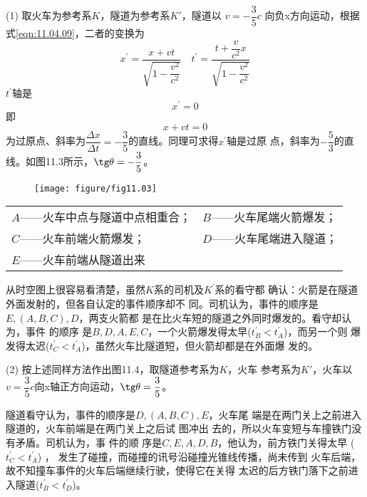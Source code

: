 \documentclass[../outline-of-mechanics.tex]{subfiles}
\begin{document}
(1) 取火车为参考系$ K $，隧道为参考系$ K' $，隧道以
$ v = - \dfrac { 3 } { 5 } c $
向负x方向运动，根据式\eqref{eqn:11.04.09}，二者的变换为
\begin{equation*}
  x^{\prime}=\frac{x+v t}{\sqrt{1-\dfrac{v^{2}}{c^{2}}}} \quad t^{\prime}=\frac{t+\dfrac{v}{c^{2}} x}{\sqrt{1-\dfrac{v^{2}}{c^{2}}}}
\end{equation*}
$ t ^ { \prime } $轴是
\begin{equation*}
  x ^ { \prime } = 0
\end{equation*}
即
\begin{equation*}
  x + v t = 0
\end{equation*}
为过原点、斜率为$ \dfrac { \Delta x } { \Delta t } = - \dfrac { 3 } { 5 } $的直线。同理可求得$ x ^ { \prime } $轴是过原
点，斜率为$ - \dfrac { 5 } { 3 } $的直线。如图11.3所示，$ \tg \theta = - \dfrac { 3 } { 5 } $。

\clearpage
\begin{figure}[h]
  \centering
  \texttt{[image: figure/fig11.03]}
  \caption{}
  \label{fig:11.03}
\end{figure}

\begin{center}
  \begin{tabular}{ll}
    $ A $——火车中点与隧道中点相重合； & $ B $——火车尾端火箭爆发； \\
    $ C $——火车前端火箭爆发；     & $ D $——火车尾端进入隧道； \\
    $ E $——火车前端从隧道出来     &                  \\
  \end{tabular}
\end{center}

从时空图上很容易看清楚，虽然$ K $系的司机及$ K ^ { \prime } $系的看守都
确认：火箭是在隧道外面发射的，但各自认定的事件顺序却不
同。司机认为，事件的顺序是$ E, (A, B, C), D $，两支火箭都
是在比火车短的隧道之外同时爆发的。看守却认为，事件
的顺序
是$ B, D, A, E, C $，一个火箭爆发得太早($ t _ { B } ^ { \prime } < t _ { A } ^ { \prime } $)，而另一个则
爆发得太迟($ t _ { C } ^ { \prime } < t _ { A } ^ { \prime } $)，虽然火车比隧道短，但火箭却都是在外面爆
发的。

(2) 按上述同样方法作出图11.4，取隧道参考系为$ K $，火车
参考系为$ K' $，火车以$ v = \dfrac { 3 } { 5 } c $向x轴正方向运动，$ \tg \theta = \dfrac { 3 } { 5 } $。

隧道看守认为，事件的顺序是$ D, (A, B, C), E $，火车尾
端是在两门关上之前进入隧道的，火车前端是在两门关上之后试
图冲出
去的，所以火车变短与车撞铁门没有矛盾。司机认为，事
件的顺\clearpage\noindent
序是$ C, E, A, D, B $，他认为，前方铁门关得太早
($ t _ { C } ^ { \prime } < t _ { A } ^ { \prime } $) ，
发生了碰撞，而碰撞的讯号沿碰撞光锥线传播，尚未传到
火车后端，故不知撞车事件的火车后端继续行驶，使得它在关得
太迟的后方铁门落下之前进入隧道($ t _ { B } ^ { \prime } < t _ { D } ^ { \prime } $)。
\end{document}
